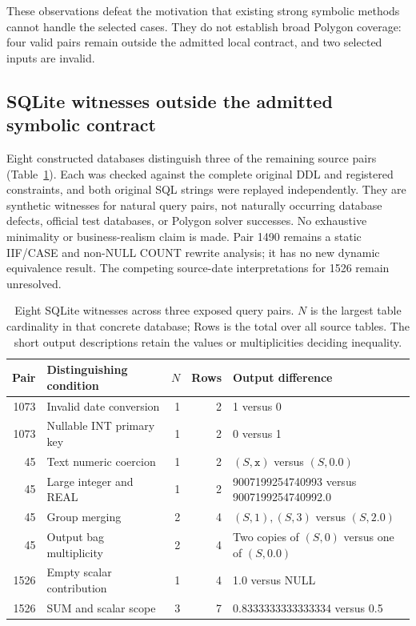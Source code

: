 These observations defeat the motivation that existing strong symbolic methods cannot handle the selected cases. They do not establish broad Polygon coverage: four valid pairs remain outside the admitted local contract, and two selected inputs are invalid.

\subsection{SQLite witnesses outside the admitted symbolic contract}
Eight constructed databases distinguish three of the remaining source pairs (Table~\ref{tab:sqlite}). Each was checked against the complete original DDL and registered constraints, and both original SQL strings were replayed independently. They are synthetic witnesses for natural query pairs, not naturally occurring database defects, official test databases, or Polygon solver successes. No exhaustive minimality or business-realism claim is made. Pair 1490 remains a static IIF/CASE and non-NULL COUNT rewrite analysis; it has no new dynamic equivalence result. The competing source-date interpretations for 1526 remain unresolved.

\begin{table}[htbp]
\centering\small
\begin{tabularx}{\textwidth}{r l rr X}
\toprule
Pair & Distinguishing condition & $N$ & Rows & Output difference\\
\midrule
1073 & Invalid date conversion & 1 & 2 & 1 versus 0\\
1073 & Nullable INT primary key & 1 & 2 & 0 versus 1\\
45 & Text numeric coercion & 1 & 2 & $(S,\texttt{x})$ versus $(S,0.0)$\\
45 & Large integer and REAL & 1 & 2 & 9007199254740993 versus 9007199254740992.0\\
45 & Group merging & 2 & 4 & $(S,1),(S,3)$ versus $(S,2.0)$\\
45 & Output bag multiplicity & 2 & 4 & Two copies of $(S,0)$ versus one of $(S,0.0)$\\
1526 & Empty scalar contribution & 1 & 4 & 1.0 versus NULL\\
1526 & SUM and scalar scope & 3 & 7 & 0.8333333333333334 versus 0.5\\
\bottomrule
\end{tabularx}
\caption{Eight SQLite witnesses across three exposed query pairs. $N$ is the largest table cardinality in that concrete database; Rows is the total over all source tables. The short output descriptions retain the values or multiplicities deciding inequality.}\label{tab:sqlite}
\end{table}

